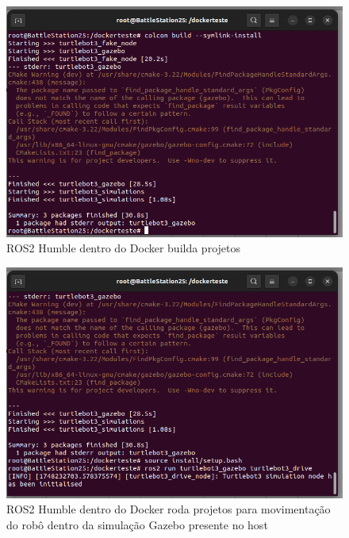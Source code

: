 \begin{figure}[htb]
    \centering
    \includegraphics[width=1\linewidth]{Figures/DockerBuildaProjetos.png}
    \caption{ROS2 Humble dentro do Docker builda projetos}
    \label{fig:enter-label}
\end{figure}
\begin{figure}[htb]
    \centering
    \includegraphics[width=1\linewidth]{Figures/DockerRodaProjetoDrive.png}
    \caption{ROS2 Humble dentro do Docker roda projetos para movimentação do robô dentro da simulação Gazebo presente no host}
    \label{fig:enter-label}
\end{figure}
